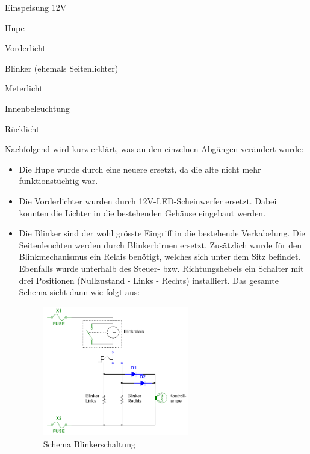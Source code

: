 \begin{compactitem}
\item Einspeisung 12V
\item Hupe
\item Vorderlicht
\item Blinker (ehemals Seitenlichter)
\item Meterlicht
\item Innenbeleuchtung
\item Rücklicht
\end{compactitem}

Nachfolgend wird kurz erklärt, was an den einzelnen Abgängen verändert wurde:
\begin{itemize}
\item Die Hupe wurde durch eine neuere ersetzt, da die alte nicht mehr funktionstüchtig war.
\item Die Vorderlichter wurden durch 12V-LED-Scheinwerfer ersetzt. Dabei konnten die Lichter in die bestehenden Gehäuse eingebaut werden.
\item Die Blinker sind der wohl grösste Eingriff in die bestehende Verkabelung. Die Seitenleuchten werden durch Blinkerbirnen ersetzt. Zusätzlich wurde für den Blinkmechanismus ein Relais benötigt, welches sich unter dem Sitz befindet. Ebenfalls wurde unterhalb des Steuer- bzw. Richtungshebels ein Schalter mit drei Positionen (Nullzustand - Links - Rechts) installiert. Das gesamte Schema sieht dann wie folgt aus:

\begin{figure}[h]
	\centering
		\includegraphics[width=0.6\textwidth]{images/Blinkerschaltung_Schema}
	\caption{Schema Blinkerschaltung}
	\label{fig:SchemaBlinkerschaltung}
\end{figure}


\end{itemize}
